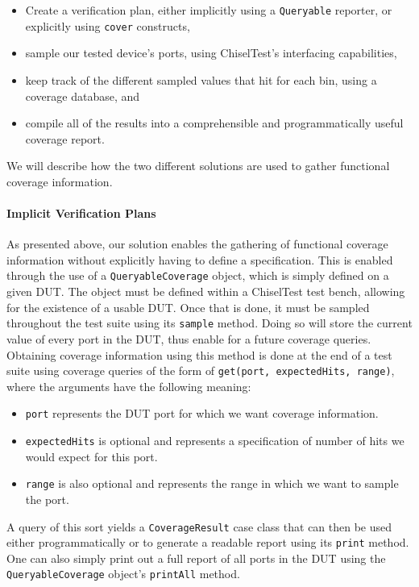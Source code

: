 \documentclass[conference]{IEEEtran}
\begin{document}
\begin{itemize}
  \item Create a verification plan, either implicitly using a \texttt{Queryable} reporter, or explicitly using \texttt{cover} constructs, 
  \item sample our tested device's ports, using ChiselTest's interfacing capabilities, 
  \item keep track of the different sampled values that hit for each bin, using a coverage database, and 
  \item compile all of the results into a comprehensible and programmatically useful coverage report.
\end{itemize}

We will describe how the two different solutions are used to gather functional coverage information.

\paragraph{Implicit Verification Plans} As presented above, our solution enables the gathering of functional coverage information without explicitly having to define a specification.
This is enabled through the use of a \texttt{QueryableCoverage} object, which is simply defined on a given DUT.
The object must be defined within a ChiselTest test bench, allowing for the existence of a usable DUT.
Once that is done, it must be sampled throughout the test suite using its \texttt{sample} method.
Doing so will store the current value of every port in the DUT, thus enable for a future coverage queries.
Obtaining coverage information using this method is done at the end of a test suite using coverage queries of the form of \texttt{get(port, expectedHits, range)}, where the arguments have the following meaning:
\begin{itemize}
	\item \texttt{port} represents the DUT port for which we want coverage information.
	\item \texttt{expectedHits} is optional and represents a specification of number of hits we would expect for this port.
	\item \texttt{range} is also optional and represents the range in which we want to sample the port.
\end{itemize}
A query of this sort yields a \texttt{CoverageResult} case class that can then be used either programmatically or to generate a readable report using its \texttt{print} method.
One can also simply print out a full report of all ports in the DUT using the \texttt{QueryableCoverage} object's \texttt{printAll} method.
\end{document}

